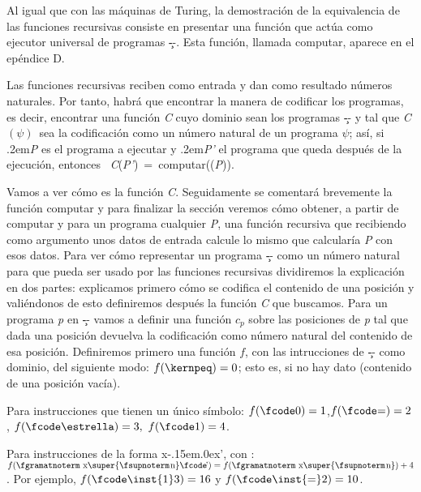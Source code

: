 %
Al igual que con las máquinas de Turing, la demostración de la equivalencia de las funciones
recursivas consiste en presentar una función que actúa como ejecutor universal de programas \c--.
Esta función, llamada {\fgabrielen computar}, aparece en el epéndice D.

Las funciones recursivas reciben como entrada y dan como resultado números naturales. Por tanto,
habrá que encontrar la manera de codificar los programas, es decir, encontrar una función {\it C}
cuyo dominio sean los programas \c-- y tal que {\it C$ (\psi) $}\ sea la codificación
como un número natural de un programa $ \psi $; así, si \kern.2em{\it P\/} es el programa
a ejecutar y \kern.2em{\it P'\/} el programa que queda después de la ejecución, entonces \hbox{{\it
C}({\it P'}) = {\fgabrielen computar}(({\it P}))}.

Vamos a ver cómo es la función {\it C}. Seguidamente se comentará brevemente la función
{\fgabrielen computar} y para finalizar la sección veremos cómo obtener, a partir de {\fgabrielen
computar} y para un programa cualquier {\it P}, una función recursiva que recibiendo como argumento
unos datos de entrada calcule lo mismo que calcularía {\it P} con esos datos.
%
Para ver cómo representar un programa \c-- como un número natural para que pueda ser usado por las
funciones recursivas dividiremos la explicación en dos partes: explicamos primero cómo se codifica
el contenido de una posición y va\-lién\-donos de esto definiremos después la función {\it C} que
buscamos.
%
Para un programa {\it p} en \c-- vamos a definir una función $ c_p $ sobre las posiciones de {\it p}
tal que dada una posición devuelva la codificación como número natural del contenido de esa
posición. Definiremos primero una función $ f $, con las intrucciones de \c-- como dominio, del
siguiente modo:
\listanormal
$ f(\kernpeq)= 0$; esto es, si no hay dato (contenido de una posición vacía).

Para instrucciones que tienen un único símbolo:
\espacioej$ f(\hbox{\fcode0})= 1$,\hskip22pt$ f(\hbox{\fcode=})=2 $,\hskip22pt $
f(\hbox{\fcode\estrella})=3, $\hskip22pt $ f(\hbox{\fcode1})=4 $.

Para instrucciones de la forma {\fgramatnoterm x\fcode\kern-.15em\lower.0ex\hbox{’}}, con \nnat:
\espacioej$ f(\hbox{{\fgramatnoterm x\super{\fsupnoterm\kern.1em n}%
\fcode\kern-.15em\lower.0ex\hbox{’}}}) =f(\hbox{{\fgramatnoterm x\super{\fsupnoterm\kern.1em n}}})+4 $.
\finlista
Por ejemplo, $ f(\hbox{{\fcode\inst{1}3}})=16 $ y $ f(\hbox{{\fcode\inst{=}2}})=10 $.

